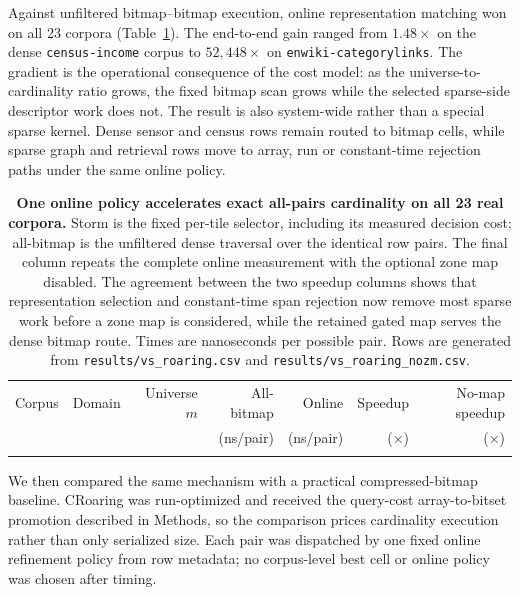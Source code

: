 Against unfiltered bitmap--bitmap execution, online representation matching won on all 23 corpora
(Table~\ref{tab:exact}). The end-to-end gain ranged from $1.48\times$ on the dense
\texttt{census-income} corpus to $52{,}448\times$ on
\texttt{enwiki-categorylinks}. The gradient is the operational consequence of the cost model: as
the universe-to-cardinality ratio grows, the fixed bitmap scan grows while the selected sparse-side
descriptor work does not. The result is also system-wide rather than a special sparse kernel. Dense
sensor and census rows remain routed to bitmap cells, while sparse graph and retrieval rows move to
array, run or constant-time rejection paths under the same online policy.

\begin{table}[!p]
\scriptsize
\setlength{\tabcolsep}{3.0pt}
\renewcommand\arraystretch{1.01}
\centering
\caption{\textbf{One online policy accelerates exact all-pairs cardinality on all 23 real
corpora.} Storm is the fixed per-tile selector, including its measured decision cost; all-bitmap is
the unfiltered dense \cell{\rB}{\rB} traversal over the identical row pairs. The final column repeats
the complete online measurement with the optional zone map disabled. The agreement between the two
speedup columns shows that representation selection and constant-time span rejection now remove
most sparse work before a zone map is considered, while the retained gated map serves the dense
bitmap route. Times are nanoseconds per possible pair. Rows are generated from
\texttt{results/vs\_roaring.csv} and \texttt{results/vs\_roaring\_nozm.csv}.}
\label{tab:exact}
\begin{tabular}{@{}l l r r r r r@{}}
\toprule
Corpus & Domain & Universe $m$ & All-bitmap & Online & Speedup & No-map speedup \\
& & & (ns/pair) & (ns/pair) & ($\times$) & ($\times$) \\
\midrule
\tabularnewline
\bottomrule
\end{tabular}
\end{table}

We then compared the same mechanism with a practical compressed-bitmap baseline. CRoaring was
run-optimized and received the query-cost array-to-bitset promotion described in Methods, so the
comparison prices cardinality execution rather than only serialized size. Each pair was dispatched
by one fixed online refinement policy from row metadata; no corpus-level best cell or online policy
was chosen after timing.

